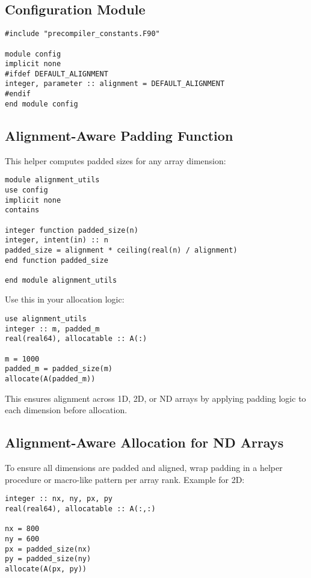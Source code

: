 \documentclass{article}
\begin{document}
\subsection{Configuration Module}
\label{fortran_config_module}
\begin{verbatim}
#include "precompiler_constants.F90"

module config
implicit none
#ifdef DEFAULT_ALIGNMENT
integer, parameter :: alignment = DEFAULT_ALIGNMENT
#endif
end module config
\end{verbatim}

\subsection{Alignment-Aware Padding Function}
This helper computes padded sizes for any array dimension:

\begin{verbatim}
module alignment_utils
use config
implicit none
contains

integer function padded_size(n)
integer, intent(in) :: n
padded_size = alignment * ceiling(real(n) / alignment)
end function padded_size

end module alignment_utils
\end{verbatim}

Use this in your allocation logic:

\begin{verbatim}
use alignment_utils
integer :: m, padded_m
real(real64), allocatable :: A(:)

m = 1000
padded_m = padded_size(m)
allocate(A(padded_m))
\end{verbatim}

This ensures alignment across 1D, 2D, or ND arrays by applying padding logic to each dimension before allocation.

\subsection{Alignment-Aware Allocation for ND Arrays}

To ensure all dimensions are padded and aligned, wrap padding in a helper procedure or macro-like pattern per array rank. Example for 2D:

\begin{verbatim}
integer :: nx, ny, px, py
real(real64), allocatable :: A(:,:)

nx = 800
ny = 600
px = padded_size(nx)
py = padded_size(ny)
allocate(A(px, py))
\end{verbatim}
\end{document}
